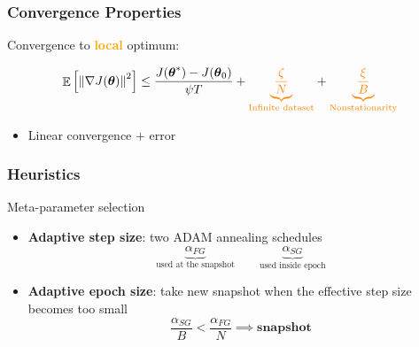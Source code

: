 \documentclass[aspectratio=169]{beamer}
\newcommand{\enb}[1]{\textcolor{poliblue1}{\textbf{#1}}}
\newcommand{\eno}[1]{\textcolor{orange}{\textbf{#1}}}
\DeclareMathOperator*{\EV}{\mathbb{E}}
\newcommand{\EVV}[2][\ppvect \in \ppspace]{\EV_{#1}\left[{#2}\right]}
\newcommand{\norm}[2][\infty]{\left\|#2\right\|_{#1}}
\newcommand{\vtheta}{\boldsymbol{\theta}}
\begin{document}
\begin{frame} 
\frametitle{Convergence Properties} 
Convergence to \eno{local} optimum:

\Large{
\begin{equation*}
	\EVV[]
	{\norm[]{\nabla J(\vtheta)}^2} 
	\leq
	\frac{J(\vtheta^*)-J(\vtheta_0)}{\psi T} +
	\textcolor{orange}{\underbrace{\frac{\zeta}{N}}_{\text{Infinite dataset}}}
	+\textcolor{orange}{\underbrace{\frac{\xi}{B}}_{\text{Nonstationarity}}}
\end{equation*}
}

\begin{itemize}
	\item Linear convergence $+$ error~\citep [similar to][]{harikandeh2015stopwasting}
\end{itemize}

\end{frame}

\begin{frame} 
\frametitle{Heuristics} 
Meta-parameter selection

\begin{itemize}
	\item \enb{Adaptive step size}: two ADAM annealing schedules
	 \begin{equation*}
	 	\underbrace{\alpha_{FG}}_{\text{used at the snapshot}} \qquad \underbrace{\alpha_{SG}}_{\text{used inside epoch}}
	 \end{equation*}
	\item \enb{Adaptive epoch size}: take new snapshot when the effective step size becomes too small
	\begin{equation*}
		\frac{\alpha_{SG}}{B} < \frac{\alpha_{FG}}{N} \implies \textbf{snapshot}
	\end{equation*}
\end{itemize}

\end{frame}
\end{document}

